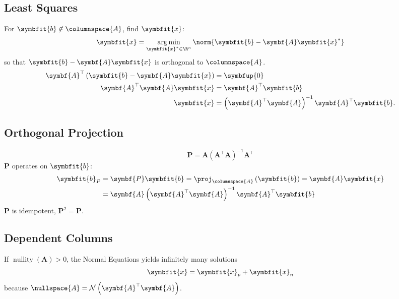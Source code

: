 \documentclass{article}
\DeclareMathOperator*{\argmin}{arg\,min}
\DeclareMathOperator*{\nullity}{nullity}
\begin{document}
\begin{multicols*}{3}
    \section{Least Squares}
    For \(\symbfit{b} \not\in \columnspace{A}\), find \(\symbfit{x}\):
    \begin{equation*}
        \symbfit{x} = \argmin_{\symbfit{x}^\ast \in \R^n} \norm{\symbfit{b} - \symbf{A}\symbfit{x}^\ast}
    \end{equation*}
    so that \(\symbfit{b} - \symbf{A}\symbfit{x}\) is orthogonal to \(\columnspace{A}\).
    \begin{align*}
        \symbf{A}^\top \left( \symbfit{b} - \symbf{A}\symbfit{x} \right) & = \symbfup{0}                                                              \\
        \symbf{A}^\top \symbf{A}\symbfit{x}                              & = \symbf{A}^\top \symbfit{b}                                               \\
        \symbfit{x}                                                      & = \left( \symbf{A}^\top \symbf{A} \right)^{-1} \symbf{A}^\top \symbfit{b}.
    \end{align*}
    \subsection{Orthogonal Projection}
    \begin{equation*}
        \symbf{P} = \symbf{A} \left( \symbf{A}^\top \symbf{A} \right)^{-1} \symbf{A}^\top
    \end{equation*}
    \(\symbf{P}\) operates on \(\symbfit{b}\):
    \begin{align*}
        \symbfit{b}_P & = \symbf{P} \symbfit{b} = \proj_{\columnspace{A}} \left( \symbfit{b} \right) = \symbf{A}\symbfit{x} \\
                      & = \symbf{A} \left( \symbf{A}^\top \symbf{A} \right)^{-1} \symbf{A}^\top \symbfit{b}
    \end{align*}
    \(\symbf{P}\) is idempotent, \(\symbf{P}^2 = \symbf{P}\).
    \subsection{Dependent Columns}
    If \(\nullity{\left( \symbf{A} \right)} > 0\), the Normal Equations yields infinitely many solutions
    \begin{equation*}
        \symbfit{x} = \symbfit{x}_p + \symbfit{x}_n
    \end{equation*}
    because \(\nullspace{A} = \mathcal{N}\left(\symbf{A}^\top \symbf{A}\right)\).

\end{multicols*}
\end{document}
